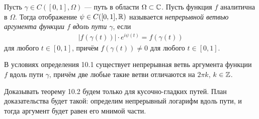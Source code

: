 \documentclass[../../main.tex]{subfiles}
\begin{document}
\begin{df}
 Пусть $ \gamma \in C([0, 1], \Omega) $ --- путь в области $ \Omega \subset \mathbb{C} $. Пусть функция $ f $ аналитична в $ \Omega $. Тогда отображение $ \psi \in C([0,1], \mathbb{R}) $ называется \textit{непрерывной ветвью аргумента функции $ f $ вдоль пути $ \gamma $}, если
 \begin{align*}
  \left| f(\gamma(t)) \right| \cdot e^{i\psi(t)} = f(\gamma(t))
 \end{align*}
 для любого $ t \in [0,1] $, причём $ f(\gamma(t)) \neq 0 $ для любого $ t \in [0, 1] $.
\end{df}
\begin{thm}
 В условиях определения 10.1 существует непрерывная ветвь аргумента функции $ f $ вдоль пути $ \gamma $, причём две любые такие ветви отличаются на $ 2\pi k $, $ k \in \mathbb{Z} $.
\end{thm}
Доказывать теорему 10.2 будем только для кусочно-гладких путей. План доказательства будет такой: определим непрерывный логарифм вдоль пути, и тогда аргумент будет равен его мнимой части.
\end{document}
